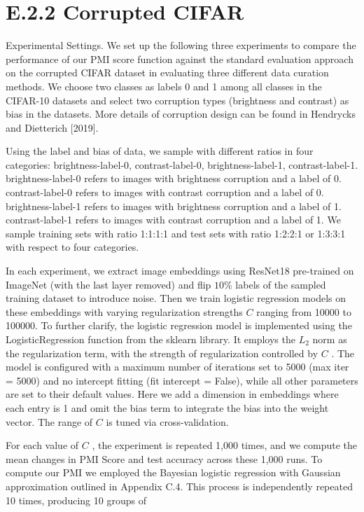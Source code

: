 \section{E.2.2 Corrupted CIFAR}\label{e.2.2-corrupted-cifar}

Experimental Settings. We set up the following three experiments to
compare the performance of our PMI score function against the standard
evaluation approach on the corrupted CIFAR dataset in evaluating three
different data curation methods. We choose two classes as labels 0 and 1
among all classes in the CIFAR-10 datasets and select two corruption
types (brightness and contrast) as bias in the datasets. More details of
corruption design can be found in Hendrycks and Dietterich {[}2019{]}.

Using the label and bias of data, we sample with different ratios in
four categories: brightness-label-0, contrast-label-0,
brightness-label-1, contrast-label-1. brightness-label-0 refers to
images with brightness corruption and a label of 0. contrast-label-0
refers to images with contrast corruption and a label of 0.
brightness-label-1 refers to images with brightness corruption and a
label of 1. contrast-label-1 refers to images with contrast corruption
and a label of 1. We sample training sets with ratio 1:1:1:1 and test
sets with ratio 1:2:2:1 or 1:3:3:1 with respect to four categories.

In each experiment, we extract image embeddings using ResNet18
pre-trained on ImageNet (with the last layer removed) and flip
\(1 0 \%\) labels of the sampled training dataset to introduce noise.
Then we train logistic regression models on these embeddings with
varying regularization strengths \(C\) ranging from 10000 to 100000. To
further clarify, the logistic regression model is implemented using the
LogisticRegression function from the sklearn library. It employs the
\(L _ { 2 }\) norm as the regularization term, with the strength of
regularization controlled by \(C\) . The model is configured with a
maximum number of iterations set to 5000 (max iter = 5000) and no
intercept fitting (fit intercept = False), while all other parameters
are set to their default values. Here we add a dimension in embeddings
where each entry is 1 and omit the bias term to integrate the bias into
the weight vector. The range of \(C\) is tuned via cross-validation.

For each value of \(C\) , the experiment is repeated 1,000 times, and we
compute the mean changes in PMI Score and test accuracy across these
1,000 runs. To compute our PMI we employed the Bayesian logistic
regression with Gaussian approximation outlined in Appendix C.4. This
process is independently repeated 10 times, producing 10 groups of

